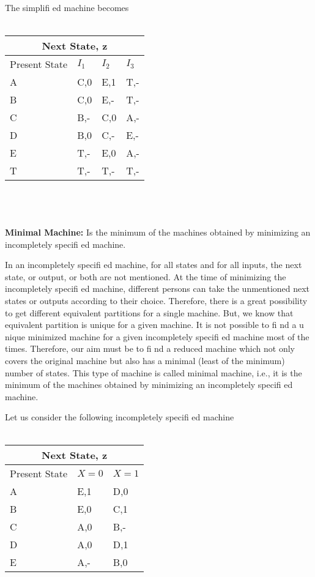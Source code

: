 \documentclass[12pt,a4paper,openany]{book}
\begin{document}
The simpliﬁ ed machine becomes
\\
\\
\begin{tabular}{ |p{3cm}|p{2cm}|p{2cm}|p{2cm}| }
\hline
\multicolumn{4}{|c|}{Next State, z} \\
\hline
Present State  &   $I_1$   &   $I_2$    &   $I_3$   \\
\hline
A  &   C,0  &   E,1  &   T,-   \\
B  &   C,0  &   E,-   &    T,-   \\
C  &   B,-   &   C,0   &   A,-   \\
D  &   B,0  &  C,-   &   E,-   \\
E  &   T,-   &  E,0    &   A,-   \\
T  &   T,-   &  T,-    &   T,-    \\
\hline
\end{tabular}
\\
\\
\\
\textbf{Minimal Machine:}  Is the minimum of the machines obtained by minimizing an incompletely speciﬁ ed machine.

In an incompletely speciﬁ ed machine, for all states and for all inputs, the next state, or output, or both are not mentioned. At the time of minimizing the incompletely speciﬁ ed machine, different persons can take the unmentioned next states or outputs according to their choice. Therefore, there is a great possibility to get different equivalent partitions for a single machine. But, we know that equivalent partition is unique for a given machine. It is not possible to ﬁ nd a u nique minimized machine for a given incompletely speciﬁ ed machine most of the times. Therefore, our aim must be to ﬁ nd a reduced machine which not only covers the original machine but also has a minimal (least of the minimum) number of states. This type of machine is called minimal machine, i.e., it is the minimum of the machines obtained by minimizing an incompletely speciﬁ ed machine.

Let us consider the following incompletely speciﬁ ed machine
\\
\\
\begin{tabular}{ |p{3cm}|p{2cm}|p{2cm}|}
\hline
\multicolumn{3}{|c|}{Next State, z} \\
\hline
Present State  &   $X = 0$        &  $X = 1$   \\
\hline
A  &   E,1  &   D,0   \\
B  &   E,0  &   C,1    \\
C  &   A,0   &   B,-   \\
D  &   A,0  &  D,1     \\
E  &   A,-    &  B,0     \\
\hline
\end{tabular}
\\
\\
\\
\end{document}
